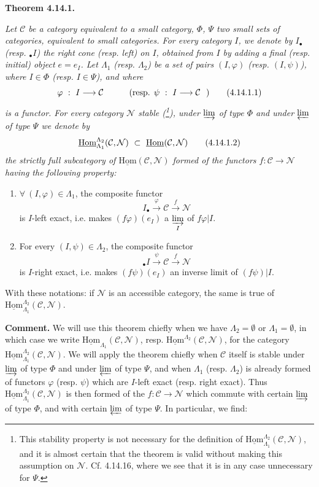 \documentclass[11pt]{article}
\newcommand{\printedpage}[1]{\marginpar{\footnotesize p.~#1}}
\newcommand{\msp}[1]{\marginpar{\footnotesize [#1]}}
\newcommand{\uHom}{\underline{\mathrm{Hom}}}
\begin{document}
\noindent\textbf{Theorem 4.14.1.} {\itshape Let $\mathcal{C}$ be a category equivalent to a small category, $\Phi$, $\Psi$ two small sets of categories, equivalent to small categories. For every category $I$, we denote by $I_{\bullet}$ (resp. ${}_{\bullet}I$) the right cone (resp. left) on $I$, obtained from $I$ by adding a final (resp. initial) object $e=e_I$. Let $\Lambda_1$ (resp. $\Lambda_2$) be a set of pairs $(I,\varphi)$ (resp. $(I,\psi)$), where $I\in\Phi$ (resp. $I\in\Psi$), and where
\[
\varphi\ :\ I \longrightarrow \mathcal{C} \qquad\quad \text{(resp. }\psi\ :\ I \longrightarrow \mathcal{C}\ \ \text{)} \tag*{\textup{(4.14.1.1)}}
\]
is a functor. For every category $\mathcal{N}$ stable (\footnote[163]{This stability property is not necessary for the definition of $\uHom^{\Lambda_2}_{\Lambda_1}(\mathcal{C},\mathcal{N})$, and it is almost certain that the theorem is valid without making this assumption on $\mathcal{N}$. Cf. 4.14.16, where we see that it is in any case unnecessary for $\Psi$.}), under $\varinjlim$ of type $\Phi$ and under $\varprojlim$ of type $\Psi$ we denote by
\[
\uHom^{\Lambda_2}_{\Lambda_1}(\mathcal{C},\mathcal{N})\ \subset\ \uHom(\mathcal{C},\mathcal{N}) \tag*{\textup{(4.14.1.2)}}
\]
the strictly full subcategory of $\uHom(\mathcal{C},\mathcal{N})$ formed of the functors $f:\mathcal{C}\longrightarrow\mathcal{N}$ having the following property:
\begin{enumerate}[leftmargin=2.5em]
\item[\textit{a)}] $\forall\ (I,\varphi)\in\Lambda_1$, the composite functor
\[
I_{\bullet} \xrightarrow{\ \varphi\ } \mathcal{C} \xrightarrow{\ f\ } \mathcal{N}
\]
is $I$-left exact, i.e. makes $(f\varphi)(e_I)$ a $\varinjlim\limits_{I}$ of $f\varphi|I$.
\printedpage{141}
\msp{page 371}
\item[\textit{b)}] For every $(I,\psi)\in\Lambda_2$, the composite functor
\[
{}_{\bullet}I \xrightarrow{\ \psi\ } \mathcal{C} \xrightarrow{\ f\ } \mathcal{N}
\]
is $I$-right exact, i.e. makes $(f\psi)(e_I)$ an inverse limit of $(f\psi)|I$.
\end{enumerate}
\noindent With these notations: if $\mathcal{N}$ is an accessible category, the same is true of $\uHom^{\Lambda_2}_{\Lambda_1}(\mathcal{C},\mathcal{N})$.}

\noindent\textbf{Comment.} We will use this theorem chiefly when we have $\Lambda_2=\emptyset$ or $\Lambda_1=\emptyset$, in which case we write $\uHom_{\Lambda_1}(\mathcal{C},\mathcal{N})$, resp. $\uHom^{\Lambda_2}(\mathcal{C},\mathcal{N})$, for the category $\uHom^{\Lambda_2}_{\Lambda_1}(\mathcal{C},\mathcal{N})$. We will apply the theorem chiefly when $\mathcal{C}$ itself is stable under $\varinjlim$ of type $\Phi$ and under $\varprojlim$ of type $\Psi$, and when $\Lambda_1$ (resp. $\Lambda_2$) is already formed of functors $\varphi$ (resp. $\psi$) which are $I$-left exact (resp. right exact). Thus $\uHom^{\Lambda_2}_{\Lambda_1}(\mathcal{C},\mathcal{N})$ is then formed of the $f:\mathcal{C}\longrightarrow\mathcal{N}$ which commute with certain $\varinjlim$ of type $\Phi$, and with certain $\varprojlim$ of type $\Psi$. In particular, we find:
\end{document}
